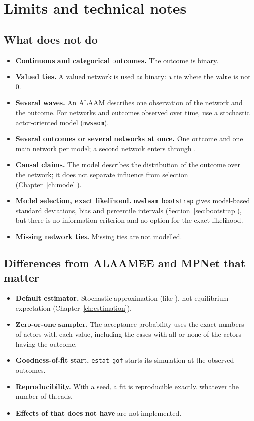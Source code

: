 \chapter{Limits and technical notes}\label{ch:limits}

\section{What \texorpdfstring{\nwalaam}{nwalaam} does not do}

\begin{itemize}[nosep]
  \item \textbf{Continuous and categorical outcomes.} The outcome is binary.
  \item \textbf{Valued ties.} A valued network is used as binary: a tie where the value is not 0.
  \item \textbf{Several waves.} An ALAAM describes one observation of the network and the outcome. For networks and outcomes observed over time, use a stochastic actor-oriented model (\texttt{nwsaom}).
  \item \textbf{Several outcomes or several networks at once.} One outcome and one main network per model; a second network enters through .
  \item \textbf{Causal claims.} The model describes the distribution of the outcome over the network; it does not separate influence from selection (Chapter~\ref{ch:model}).
  \item \textbf{Model selection, exact likelihood.} \texttt{nwalaam bootstrap} gives model-based standard deviations, bias and percentile intervals (Section~\ref{sec:bootstrap}), but there is no information criterion and no option for the exact likelihood.
  \item \textbf{Missing network ties.} Missing ties are not modelled.
\end{itemize}

\section{Differences from ALAAMEE and MPNet that matter}

\begin{itemize}[nosep]
  \item \textbf{Default estimator.} Stochastic approximation (like \mpnet{}), not equilibrium expectation (Chapter~\ref{ch:estimation}).
  \item \textbf{Zero-or-one sampler.} The acceptance probability uses the exact numbers of actors with each value, including the cases with all or none of the actors having the outcome.
  \item \textbf{Goodness-of-fit start.} \texttt{estat gof} starts its simulation at the observed outcomes.
  \item \textbf{Reproducibility.} With a seed, a fit is reproducible exactly, whatever the number of threads.
  \item \textbf{Effects of \mpnet{} that \alaamee{} does not have} are not implemented.
\end{itemize}

